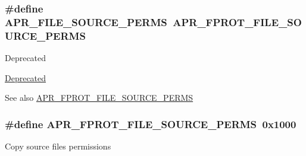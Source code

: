 \subsubsection[{\texorpdfstring{A\+P\+R\+\_\+\+F\+I\+L\+E\+\_\+\+S\+O\+U\+R\+C\+E\+\_\+\+P\+E\+R\+MS}{APR_FILE_SOURCE_PERMS}}]{\setlength{\rightskip}{0pt plus 5cm}\#define A\+P\+R\+\_\+\+F\+I\+L\+E\+\_\+\+S\+O\+U\+R\+C\+E\+\_\+\+P\+E\+R\+MS~{\bf A\+P\+R\+\_\+\+F\+P\+R\+O\+T\+\_\+\+F\+I\+L\+E\+\_\+\+S\+O\+U\+R\+C\+E\+\_\+\+P\+E\+R\+MS}}\hypertarget{group__apr__file__permissions_gaa72c8bc4ab1bd5615bee4333d23dc16b}{}\label{group__apr__file__permissions_gaa72c8bc4ab1bd5615bee4333d23dc16b}
\begin{DoxyRefDesc}{Deprecated}
\item[\hyperlink{deprecated__deprecated000016}{Deprecated}]\end{DoxyRefDesc}
\begin{DoxySeeAlso}{See also}
\hyperlink{group__apr__file__permissions_gac08d4e868c7c9532f7c97c70556663dc}{A\+P\+R\+\_\+\+F\+P\+R\+O\+T\+\_\+\+F\+I\+L\+E\+\_\+\+S\+O\+U\+R\+C\+E\+\_\+\+P\+E\+R\+MS} 
\end{DoxySeeAlso}
\subsubsection[{\texorpdfstring{A\+P\+R\+\_\+\+F\+P\+R\+O\+T\+\_\+\+F\+I\+L\+E\+\_\+\+S\+O\+U\+R\+C\+E\+\_\+\+P\+E\+R\+MS}{APR_FPROT_FILE_SOURCE_PERMS}}]{\setlength{\rightskip}{0pt plus 5cm}\#define A\+P\+R\+\_\+\+F\+P\+R\+O\+T\+\_\+\+F\+I\+L\+E\+\_\+\+S\+O\+U\+R\+C\+E\+\_\+\+P\+E\+R\+MS~0x1000}\hypertarget{group__apr__file__permissions_gac08d4e868c7c9532f7c97c70556663dc}{}\label{group__apr__file__permissions_gac08d4e868c7c9532f7c97c70556663dc}
Copy source file\textquotesingle{}s permissions 
